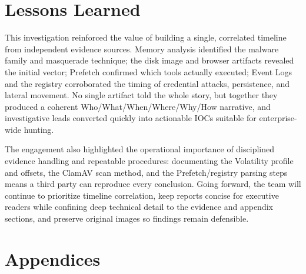 \documentclass[12pt]{article}
\begin{document}
\section{Lessons Learned}

This investigation reinforced the value of building a single, correlated timeline from independent evidence sources. Memory analysis identified the malware family and masquerade technique; the disk image and browser artifacts revealed the initial vector; Prefetch confirmed which tools actually executed; Event Logs and the registry corroborated the timing of credential attacks, persistence, and lateral movement. No single artifact told the whole story, but together they produced a coherent Who/What/When/Where/Why/How narrative, and investigative leads converted quickly into actionable IOCs suitable for enterprise-wide hunting.

The engagement also highlighted the operational importance of disciplined evidence handling and repeatable procedures: documenting the Volatility profile and offsets, the ClamAV scan method, and the Prefetch/registry parsing steps means a third party can reproduce every conclusion. Going forward, the team will continue to prioritize timeline correlation, keep reports concise for executive readers while confining deep technical detail to the evidence and appendix sections, and preserve original images so findings remain defensible.

\section{Appendices}
\end{document}

